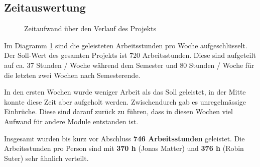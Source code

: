 \subsection{Zeitauswertung}
\label{sub:Zeitauswertung}

\begin{figure}[H]
    \centering

    \caption[Diagramm Zeitaufwand über den Verlauf des Projekts]{Zeitaufwand über den Verlauf des Projekts}
    \label{chart:Zeitauswertung_weeks}
\end{figure}

Im Diagramm \ref{chart:Zeitauswertung_weeks} sind die geleisteten Arbeitsstunden pro Woche aufgeschlüsselt.
Der Soll-Wert des gesamten Projekts ist 720 Arbeitsstunden.
Diese sind aufgeteilt auf ca. 37 Stunden / Woche während dem Semester und 80 Stunden / Woche für die letzten zwei Wochen nach Semesterende.

In den ersten Wochen wurde weniger Arbeit als das Soll geleistet, in der Mitte konnte diese Zeit aber aufgeholt werden.
Zwischendurch gab es unregelmässige Einbrüche.
Diese sind darauf zurück zu führen, dass in diesen Wochen viel Aufwand für andere Module entstanden ist.

Insgesamt wurden bis kurz vor Abschluss \textbf{746 Arbeitsstunden} geleistet.
Die Arbeitsstunden pro Person sind mit \textbf{370 h} (Jonas Matter) und \textbf{376 h} (Robin Suter) sehr ähnlich verteilt.


